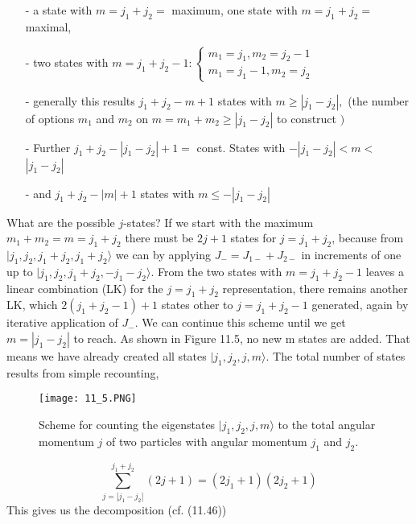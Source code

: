 \begin{enumerate}
    \item[-] a state with $m=j_{1}+j_{2}=$ maximum, one state with $m=j_{1}+j_{2}=$ maximal,
    \item[-]  two states with $m=j_{1}+j_{2}-1:\left\{\begin{array}{l}{m_{1}=j_{1}, m_{2}=j_{2}-1} \\ {m_{1}=j_{1}-1, m_{2}=j_{2}}\end{array}\right.$
    \item[-] generally this results $j_{1}+j_{2}-m+1$ states with $m \geq\left|j_{1}-j_{2}\right|,$ (the number of options $m_{1}$ and $m_{2}$ on $m=m_{1}+m_{2} \geq\left|j_{1}-j_{2}\right|$ to construct $)$
    \item[-] Further $j_{1}+j_{2}-\left|j_{1}-j_{2}\right|+1=$ const. States with $-\left|j_{1}-j_{2}\right|<m<$
        $\left|j_{1}-j_{2}\right|$
    \item[-] and $j_{1}+j_{2}-|m|+1$ states with $m \leq-|j_{1}-j_{2}|$
\end{enumerate}
What are the possible $j$-states? If we start with the maximum $m_1 + m_2 = m = j_1 + j_2$ there must be $2j + 1$ states for $j = j_1 + j_2$, because from$ | j_1, j_2, j_1 + j_2, j_1 + j_2\rangle$ we can by applying $J_− = J_{1−} + J_{2−}$ in increments of one up to $| j_1, j_2, j_1 + j_2, −j_1 - j_2\rangle$. From the two states with $m = j_1 + j_2−1$ leaves a linear combination (LK) for the $j = j_1 + j_2$ representation, there remains another LK, which $2 (j_1 + j_2−1) + 1$ states other to $j = j_1 + j_2 - 1$ generated, again by iterative application of $J_−$. We can continue this scheme until we get $m= | j_1 − j_2 |$ to reach. As shown in Figure 11.5, no new m states are added. That means we have already created all states $ | j_1, j_2, j, m\rangle$. The total number of states results from simple recounting,
\begin{figure}[ht]
        \centering
        \texttt{[image: 11\_5.PNG]}
        \caption{Scheme for counting the eigenstates $| j_1, j_2, j, m\rangle$ to the total angular momentum $j$ of two particles with angular momentum $j_1$ and $j_2$.}
\end{figure}
\begin{equation}
    \sum_{j=\left|j_{1}-j_{2}\right|}^{j_{1}+j_{2}}(2 j+1)=\left(2 j_{1}+1\right)\left(2 j_{2}+1\right)
    \end{equation}
This gives us the decomposition (cf. (11.46))
